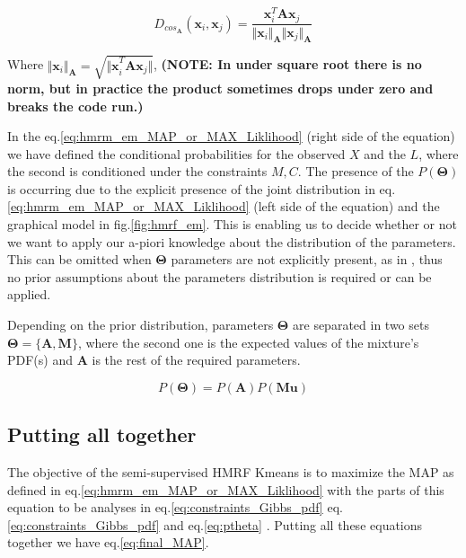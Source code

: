\documentclass[dvips,dvipdfm,pdftex]{llncs}
\begin{document}
\begin{equation}
	D_{cos_{\mathbf{A}}}(\mathbf{x}_{i},\mathbf{x}_{j})=\frac{\mathbf{x}_{i}^{T}\mathbf{A}\mathbf{x}_{j}}{\Vert\mathbf{x}_{i}\Vert_{\mathbf{A}}\Vert\mathbf{x}_{j}\Vert_{\mathbf{A}}}
	\label{eq:parametrized_cos_sim}
\end{equation}

Where $\Vert\mathbf{x}_{i}\Vert_{\mathbf{A}}=\sqrt{\mathbf{\Vert x}_{i}^{T}\mathbf{A}\mathbf{x}_{j}\Vert}$, \textbf{(NOTE: In \cite{basu2004probabilistic} under square root there is no norm, but in practice the product sometimes drops under zero and breaks the code run.)}

In the eq.\ref{eq:hmrm_em_MAP_or_MAX_Liklihood} (right side of the equation) we have defined the conditional probabilities for the observed $X$ and the $L$, where the second is conditioned under the constraints ${M,C}$. The presence of the $P(\mathbf{\Theta})$ is occurring due to the explicit presence of the joint distribution in eq.\ref{eq:hmrm_em_MAP_or_MAX_Liklihood} (left side of the equation) and the graphical model in fig.\ref{fig:hmrf_em}. This is enabling us to decide whether or not we want to apply our a-piori knowledge about the distribution of the parameters. This can be omitted when $\mathbf{\Theta}$ parameters are not explicitly present, as in \cite{basu2004probabilistic}, thus no prior assumptions about the parameters distribution is required or can be applied.

Depending on the prior distribution, parameters $\mathbf{\Theta}$ are separated in two sets $\mathbf{\Theta}=\{\mathbf{A},\mathbf{M}\}$, where the second one is the expected values of the mixture's PDF(s) and $\mathbf{A}$ is the rest of the required parameters.

\begin{equation}
	P(\mathbf{\Theta})=P(\mathbf{A})P(\mathbf{Mu})
\label{eq:ptheta}
\end{equation}


\subsection{Putting all together}

The objective of the semi-supervised HMRF Kmeans is to maximize the MAP as defined in eq.\ref{eq:hmrm_em_MAP_or_MAX_Liklihood} with the parts of this equation to be analyses in eq.\ref{eq:constraints_Gibbs_pdf} eq.\ref{eq:constraints_Gibbs_pdf} and eq.\ref{eq:ptheta} . Putting all these equations together we have eq.\ref{eq:final_MAP}.
\end{document}
